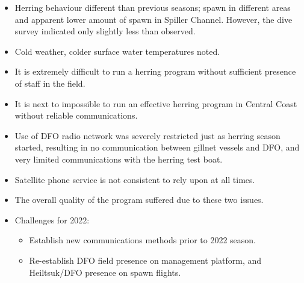 \begin{itemize}
\item Herring behaviour different than previous seasons;
spawn in different areas and apparent lower amount of spawn in Spiller Channel.
However, the dive survey indicated only slightly less than observed.
\item Cold weather, colder surface water temperatures noted.
\item It is extremely difficult to run a herring program without
sufficient presence of staff in the field.
\item It is next to impossible to run an effective herring program
in Central Coast without reliable communications.
\item Use of DFO radio network was severely restricted just as herring season started,
resulting in no communication between gillnet vessels and DFO,
and very limited communications with the herring test boat.
\item Satellite phone service is not consistent to rely upon at all times.
\item The overall quality of the program suffered due to these two issues.
\item Challenges for 2022:
\begin{itemize}
\item Establish new communications methods prior to 2022 season.
\item Re-establish DFO field presence on management platform,
and Heiltsuk/DFO presence on spawn flights.
\end{itemize}
\end{itemize}